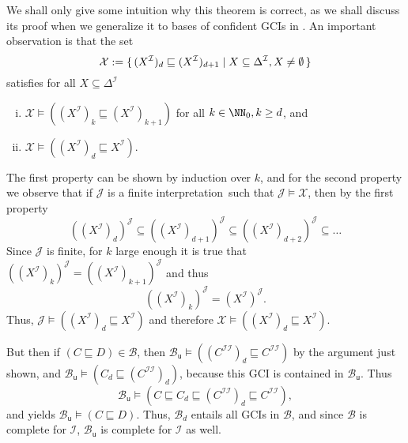 We shall only give some intuition why this theorem is correct, as we shall discuss its
proof when we generalize it to bases of confident GCIs in .
An important observation is that the set
\begin{equation*}
  \mathcal{X} := {\{\, (X^{\mathcal{I}})_d \sqsubseteq (X^{\mathcal{I}})_{d+1} \mid X
    \subseteq \Delta^{\mathcal{I}}, X \neq \emptyset \,\}}
\end{equation*}
satisfies for all $X \subseteq \Delta^{\mathcal{I}}$
\begin{enumerate}[i. ]
\item $\mathcal{X} \models ( (X^{\mathcal{I}})_k \sqsubseteq (X^{\mathcal{I}})_{k+1} )$
  for all $k \in \NN_0, k \geq d$, and
\item $\mathcal{X} \models ( (X^{\mathcal{I}})_d \sqsubseteq X^{\mathcal{I}} )$.
\end{enumerate}
The first property can be shown by induction over $k$, and for the second property we
observe that if $\mathcal{J}$ is a finite interpretation\ such that $\mathcal{J} \models \mathcal{X}$, then by the first
property
\begin{equation*}
  ((X^{\mathcal{I}})_d)^{\mathcal{J}} \subseteq ((X^{\mathcal{I}})_{d+1})^{\mathcal{J}}
  \subseteq ((X^{\mathcal{I}})_{d+2})^{\mathcal{J}} \subseteq \dots
\end{equation*}
Since $\mathcal{J}$ is finite, for $k$ large enough it is true that
$((X^{\mathcal{I}})_k)^{\mathcal{J}} = ((X^{\mathcal{I}})_{k+1})^{\mathcal{J}}$ and thus
\begin{equation*}
  ((X^{\mathcal{I}})_k)^{\mathcal{J}} = (X^{\mathcal{I}})^{\mathcal{J}}.
\end{equation*}
Thus, $\mathcal{J} \models ( (X^{\mathcal{I}})_d \sqsubseteq X^{\mathcal{I}} )$ and
therefore $\mathcal{X} \models ( (X^{\mathcal{I}})_d \sqsubseteq X^{\mathcal{I}} )$.

But then if $(C \sqsubseteq D) \in \mathcal{B}$, then $\mathcal{B}_{\mathsf{u}} \models (
(C^{\mathcal{I}\mathcal{I}})_d \sqsubseteq C^{\mathcal{I}\mathcal{I}})$ by the argument
just shown, and $\mathcal{B}_{\mathsf{u}} \models ( C_d \sqsubseteq
(C^{\mathcal{I}\mathcal{I}})_d )$, because this GCI is contained in
$\mathcal{B}_{\mathsf{u}}$.  Thus
\begin{equation*}
  \mathcal{B}_{\mathsf{u}} \models ( C \sqsubseteq C_d \sqsubseteq (C^{\mathcal{I}\mathcal{I}})_d
  \sqsubseteq C^{\mathcal{I}\mathcal{I}}),
\end{equation*}
and  yields $\mathcal{B}_{\mathsf{u}} \models (C
\sqsubseteq D)$.  Thus, $\mathcal{B}_d$ entails all GCIs in $\mathcal{B}$, and since
$\mathcal{B}$ is complete for $\mathcal{I}$, $\mathcal{B}_{\mathsf{u}}$ is complete for
$\mathcal{I}$ as well.



